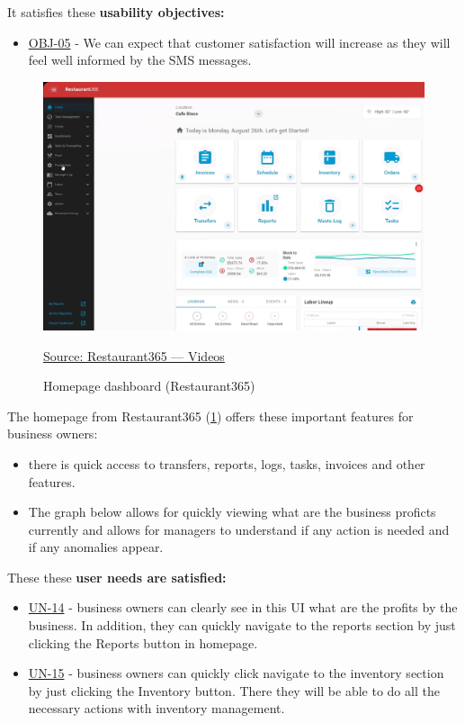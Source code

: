 \documentclass[]{VUMIFTemplateClass}
\begin{document}
It satisfies these \textbf{usability objectives:}

\begin{itemize}
    \item \hyperref[OBJ-05]{OBJ-05} - We can expect that customer satisfaction will increase as they will feel well informed by the SMS messages. 
\end{itemize}



\begin{figure}[H]
    \centering
    \includegraphics[width=\textwidth]{images/examples/homepage_r365.png}
    \caption{Homepage dashboard (Restaurant365)}
    \href{https://www.restaurant365.com/resource-category/videos/}{Source: Restaurant365 — Videos}
    \label{fig:homapage-dashboard}
\end{figure}


The homepage from Restaurant365 (\ref{fig:homapage-dashboard}) offers these important features for business owners: 

\begin{itemize}
    \item there is quick access to transfers, reports, logs, tasks, invoices and other features.
    \item The graph below allows for quickly viewing what are the business proficts currently and allows for managers to understand if any action is needed and if any anomalies appear.
\end{itemize}

These these \textbf{user needs are satisfied:}
\begin{itemize}
    \item \hyperref[UN-14]{UN-14} - business owners can clearly see in this UI what are the profits by the business. In addition, they can quickly navigate to the reports section by just clicking the Reports button in homepage.
    \item \hyperref[UN-15]{UN-15} - business owners can quickly click navigate to the inventory section by just clicking the Inventory button. There they will be able to do all the necessary actions with inventory management.
\end{itemize}
\end{document}
